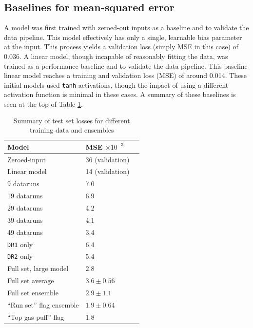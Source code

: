 \subsection{Baselines for mean-squared error}
\label{sec:baselines}

A model was first trained with zeroed-out inputs as a baseline and to validate the data pipeline. This model effectively has only a single, learnable bias parameter at the input. This process yields a validation loss (simply MSE in this case) of 0.036. A linear model, though incapable of reasonably fitting the data, was trained as a performance baseline and to validate the data pipeline. This baseline linear model reaches a training and validation loss (MSE) of around 0.014. These initial models used \texttt{tanh} activations, though the impact of using a different activation function is minimal in these cases.
A summary of these baselines is seen at the top of Table \ref{tab:loss_summary}.

\begin{table}
	\small
	\centering
	\caption{Summary of test set losses for different training data and ensembles}
	\label{tab:loss_summary}
	\begin{tabular}{l l l}
		Model & MSE $\times 10^{-3}$ \\
		\hline
		Zeroed-input & 36  (validation) \\
		Linear model & 14 (validation) \\
		\hline
		9 dataruns & 7.0\\
		19 dataruns & 6.9 \\
		29 dataruns & 4.2 \\
		39 dataruns & 4.1 \\ 
		49 dataruns & 3.4 \\
		\texttt{DR1} only & $6.4$ \\
		\texttt{DR2} only & $5.4$ \\
		Full set, large model & $2.8$ \\
		Full set average & $3.6 \pm 0.56$ \\
		Full set ensemble & $2.9 \pm 1.1$ \\
		\hline
		``Run set'' flag ensemble & $1.9 \pm 0.64$ \\
		``Top gas puff'' flag & 1.8 \\
		
	\end{tabular}
\end{table}

